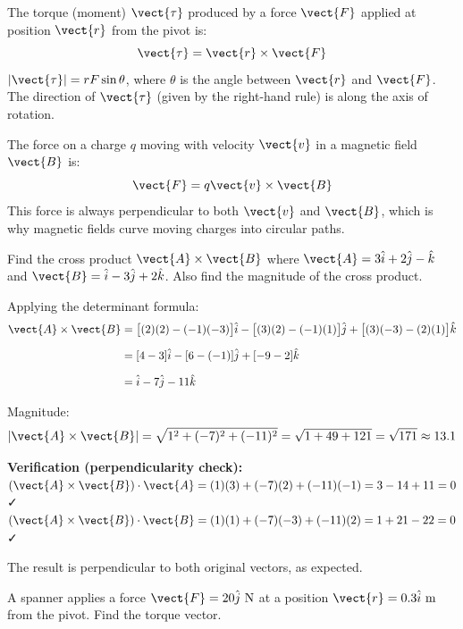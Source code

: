 \begin{keybox}
The torque (moment) $\vect{\tau}$ produced by a force
$\vect{F}$ applied at position $\vect{r}$ from the
pivot is:
\[
  \vect{\tau} = \vect{r}\times\vect{F}
\]
$|\vect{\tau}| = rF\sin\theta$, where $\theta$ is the
angle between $\vect{r}$ and $\vect{F}$.
The direction of $\vect{\tau}$ (given by the right-hand
rule) is along the axis of rotation.
\end{keybox}

\begin{keybox}
The force on a charge $q$ moving with velocity
$\vect{v}$ in a magnetic field $\vect{B}$ is:
\[
  \vect{F} = q\vect{v}\times\vect{B}
\]
This force is always perpendicular to both $\vect{v}$
and $\vect{B}$, which is why magnetic fields curve
moving charges into circular paths.
\end{keybox}

\begin{examplebox}[2.15]
Find the cross product $\vect{A}\times\vect{B}$ where
$\vect{A} = 3\hat{i} + 2\hat{j} - \hat{k}$ and
$\vect{B} = \hat{i} - 3\hat{j} + 2\hat{k}$.
Also find the magnitude of the cross product.
\end{examplebox}

\begin{solutionbox}
Applying the determinant formula:
\begin{align*}
  \vect{A}\times\vect{B}
  &= \bigl[(2)(2) - (-1)(-3)\bigr]\hat{i}
   - \bigl[(3)(2) - (-1)(1)\bigr]\hat{j}
   + \bigl[(3)(-3) - (2)(1)\bigr]\hat{k}\\[6pt]
  &= [4 - 3]\hat{i}
   - [6 - (-1)]\hat{j}
   + [-9 - 2]\hat{k}\\[6pt]
  &= \hat{i} - 7\hat{j} - 11\hat{k}
\end{align*}

Magnitude:
\[
  |\vect{A}\times\vect{B}|
  = \sqrt{1^2 + (-7)^2 + (-11)^2}
  = \sqrt{1 + 49 + 121}
  = \sqrt{171}
  \approx 13.1
\]

\textbf{Verification (perpendicularity check):}
$(\vect{A}\times\vect{B})\cdot\vect{A}
= (1)(3)+(-7)(2)+(-11)(-1)
= 3 - 14 + 11 = 0$ ✓\\
$(\vect{A}\times\vect{B})\cdot\vect{B}
= (1)(1)+(-7)(-3)+(-11)(2)
= 1 + 21 - 22 = 0$ ✓

The result is perpendicular to both original vectors,
as expected.
\end{solutionbox}

\begin{examplebox}[2.16]
A spanner applies a force $\vect{F} = 20\hat{j}\ \text{N}$
at a position $\vect{r} = 0.3\hat{i}\ \text{m}$ from
the pivot. Find the torque vector.
\end{examplebox}

